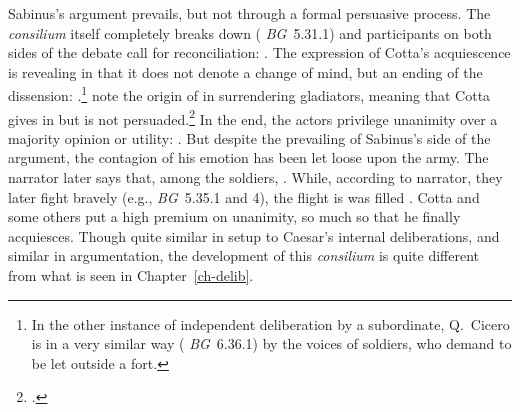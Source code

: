 \documentclass[12pt,letterpaper,oneside,final]{memoir}
\begin{document}
Sabinus's argument prevails, but not through a formal persuasive process. The \emph{consilium} itself completely breaks down ( \emph{BG}~5.31.1) and participants on both sides of the debate call for reconciliation: . The expression of Cotta's acquiescence is revealing in that it does not denote a change of mind, but an ending of the dissension: .\footnote{In the other instance of independent deliberation by a subordinate, Q.~Cicero is  in a very similar way ( \emph{BG}~6.36.1) by the voices of soldiers, who demand to be let outside a fort.} \textcite{kranerdittenbergermeusel1967} note the origin of  in surrendering gladiators, meaning that Cotta gives in but is not persuaded.\footnote{.} In the end, the actors privilege unanimity over a majority opinion or utility: . But despite the prevailing of Sabinus's side of the argument, the contagion of his emotion has been let loose upon the army. The narrator later says that, among the soldiers, . While, according to narrator, they later fight bravely (e.g., \emph{BG}~5.35.1 and 4), the flight is was filled . Cotta and some others put a high premium on unanimity, so much so that he finally acquiesces. Though quite similar in setup to Caesar's internal deliberations, and similar in argumentation, the development of this \emph{consilium} is quite different from what is seen in Chapter~\ref{ch-delib}.
\end{document}
